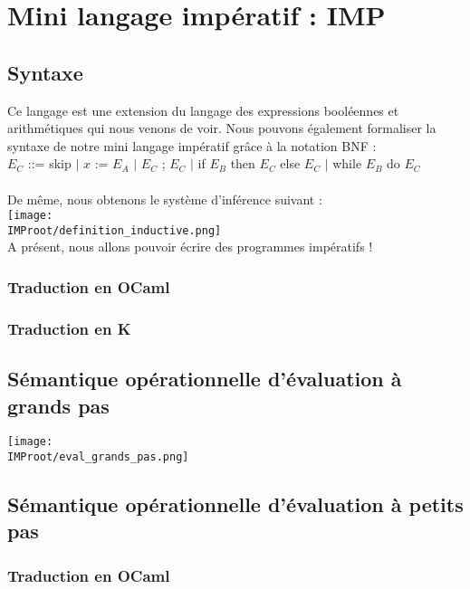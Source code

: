 
\chapter{Mini langage impératif : IMP}

\section{Syntaxe}

Ce langage est une extension du langage des expressions booléennes et arithmétiques qui nous venons de voir.
Nous pouvons également formaliser la syntaxe de notre mini langage impératif grâce à la notation BNF : \\
$E_C$ ::= skip $|$ $x$ := $E_A$ $|$ $E_C$ ; $E_C$ $|$ if $E_B$ then $E_C$ else $E_C$ $|$ while $E_B$ do $E_C$ \\
\vspace{1\baselineskip} \\
De même, nous obtenons le système d'inférence suivant : \\
\texttt{[image: \\IMProot/definition\_inductive.png]} \\
A présent, nous allons pouvoir écrire des programmes impératifs !

	\subsection{Traduction en OCaml}
	

	\subsection{Traduction en K}
	




\section{Sémantique opérationnelle d’évaluation à grands pas}

\texttt{[image: \\IMProot/eval\_grands\_pas.png]}


\section{Sémantique opérationnelle d’évaluation à petits pas}

	\subsection{Traduction en OCaml}

